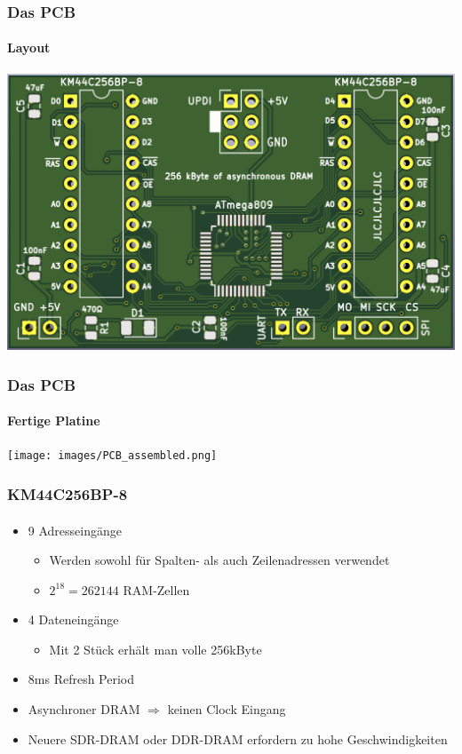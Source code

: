 \documentclass{beamer}
\begin{document}
\begin{frame}

	\frametitle{Das PCB}
	\framesubtitle{Layout}
	\begin{center}
		\includegraphics[scale=0.15]{images/KiCAD_3D_PCB_View.png}
	\end{center}
	
\end{frame}

\begin{frame}

	\frametitle{Das PCB}
	\framesubtitle{Fertige Platine}
	\begin{center}
		\texttt{[image: images/PCB\_assembled.png]}
	\end{center}
	
\end{frame}

\begin{frame}

	\frametitle{KM44C256BP-8}
	\framesubtitle{}
	\begin{itemize}
		\item 9 Adresseingänge
		\begin{itemize}
			\item Werden sowohl für Spalten- als auch Zeilenadressen verwendet
			\item $2^{18} = 262144$ RAM-Zellen
		\end{itemize}
		\item 4 Dateneingänge
		\begin{itemize}
			\item Mit 2 Stück erhält man volle 256kByte
		\end{itemize}
		\item 8ms Refresh Period
		\item Asynchroner DRAM $\Rightarrow$ keinen Clock Eingang
		\item Neuere SDR-DRAM oder DDR-DRAM erfordern zu hohe Geschwindigkeiten
	\end{itemize}
	
\end{frame}
\end{document}
